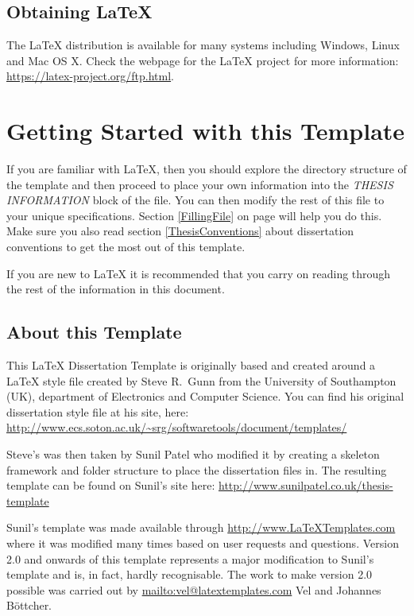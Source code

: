 \subsection{Obtaining \LaTeX{}}
 
The \LaTeX{} distribution is available for many systems including Windows, Linux and Mac OS X. Check the webpage for the \LaTeX{} project for more information: \url{https://latex-project.org/ftp.html}.


\section{Getting Started with this Template}

If you are familiar with \LaTeX{}, then you should explore the directory structure of the template and then proceed to place your own information into the \emph{THESIS INFORMATION} block of the  file. You can then modify the rest of this file to your unique specifications. Section \ref{FillingFile} on page \pageref{FillingFile} will help you do this. Make sure you also read section \ref{ThesisConventions} about dissertation conventions to get the most out of this template.

If you are new to \LaTeX{} it is recommended that you carry on reading through the rest of the information in this document.

\subsection{About this Template}

This \LaTeX{} Dissertation Template is originally based and created around a \LaTeX{} style file created by Steve R.\ Gunn from the University of Southampton (UK), department of Electronics and Computer Science. You can find his original dissertation style file at his site, here:
\url{http://www.ecs.soton.ac.uk/~srg/softwaretools/document/templates/}

Steve's  was then taken by Sunil Patel who modified it by creating a skeleton framework and folder structure to place the dissertation files in. The resulting template can be found on Sunil's site here:
\url{http://www.sunilpatel.co.uk/thesis-template}

Sunil's template was made available through \url{http://www.LaTeXTemplates.com} where it was modified many times based on user requests and questions. Version 2.0 and onwards of this template represents a major modification to Sunil's template and is, in fact, hardly recognisable. The work to make version 2.0 possible was carried out by \url{mailto:vel@latextemplates.com} {Vel} and Johannes Böttcher.

